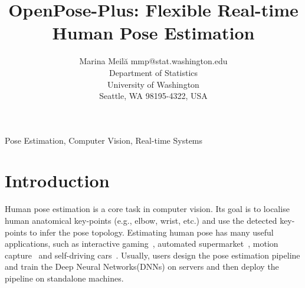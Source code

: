 \documentclass[twoside,11pt]{article}
\begin{document}
\title{OpenPose-Plus: Flexible Real-time Human Pose Estimation}

\author{\name Marina Meil\u{a} \email mmp@stat.washington.edu \\
       \addr Department of Statistics\\
       University of Washington\\
       Seattle, WA 98195-4322, USA
       }


\maketitle

\begin{abstract}%
\end{abstract}

\begin{keywords}
  Pose Estimation, Computer Vision, Real-time Systems
\end{keywords}

\section{Introduction}

Human pose estimation is a core task in computer vision.
Its goal is to localise human anatomical key-points (e.g., elbow, wrist, etc.)
and use the detected key-points to infer the pose topology. 
Estimating human pose has many useful applications, such as interactive gaming~\citep{x}, automated supermarket~\citep{x}, motion capture~\citep{x} and self-driving cars~\citep{x}. Usually, users design the pose estimation pipeline and train the Deep Neural Networks(DNNs) on servers and then deploy the pipeline on standalone machines.
\end{document}
